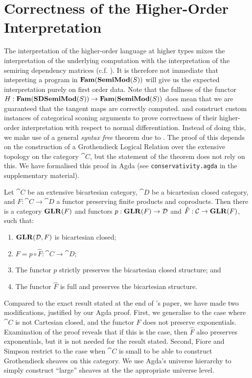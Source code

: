 \section{Correctness of the Higher-Order Interpretation}
\label{sec:definability}

The interpretation of the higher-order language at higher types mixes
the interpretation of the underlying computation with the
interpretation of the semiring dependency matrices
(c.f. ). It is therefore not immediate that
intepreting a program in $\mathbf{Fam}(\mathbf{SemiMod}(S))$ will give us the expected
interpretation purely on first order data. Note that the fullness of
the functor $H : \mathbf{Fam}(\mathbf{SDSemiMod}(S)) \to \mathbf{Fam}(\mathbf{SemiMod}(S))$ does mean
that we are guaranteed that the tangent maps are correctly computed.
\citet{vakar22} and \citet{nunes2023} construct custom
instances of categorical sconing arguments to prove correctness of
their higher-order interpretation with respect to normal
differentiation. Instead of doing this, we make use of a general
\emph{syntax free} theorem due to \citet{fiore-simpson99}. The proof
of this depends on the construction of a Grothendieck Logical Relation
over the extensive topology on the category $\cat{C}$, but the
statement of the theorem does not rely on this. We have formalised
this proof in Agda (see \texttt{conservativity.agda} in the
supplementary material).

\begin{theorem}
  \label{thm:glr-definability}
  Let $\cat{C}$ be an extensive bicartesian category, $\cat{D}$ be a
  bicartesian closed category, and $F : \cat{C} \to \cat{D}$ a functor
  preserving finite products and coproducts. Then there is a category
  $\mathbf{GLR}(F)$ and functors $p : \mathbf{GLR}(F) \to \mathcal{D}$ and
  $\hat{F} : \mathcal{C} \to \mathbf{GLR}(F)$, such that:
  \begin{enumerate}
  \item $\mathbf{GLR}(\mathcal{D},F)$ is bicartesian closed;
  \item $F = p \circ \hat{F} : \cat{C} \to \cat{D}$;
  \item The functor $p$ strictly preserves the bicartesian closed structure; and
  \item The functor $\hat{F}$ is full and preserves the bicartesian structure.
  \end{enumerate}
\end{theorem}

\begin{remark}
  Compared to the exact result stated at the end of
  \citet{fiore-simpson99}'s paper, we have made two modifications,
  justified by our Agda proof. First, we generalise to the case where
  $\cat{C}$ is not Cartesian closed, and the functor $F$ does not
  preserve exponentials. Examination of the proof reveals that if this
  is the case, then $\hat{F}$ also preserves exponentials, but it is
  not needed for the result stated. Second, Fiore and Simpson restrict
  to the case when $\cat{C}$ is small to be able to construct
  Grothendieck sheaves on this category. We use Agda's universe
  hierarchy to simply construct ``large'' sheaves at the the
  appropriate universe level.
\end{remark}

